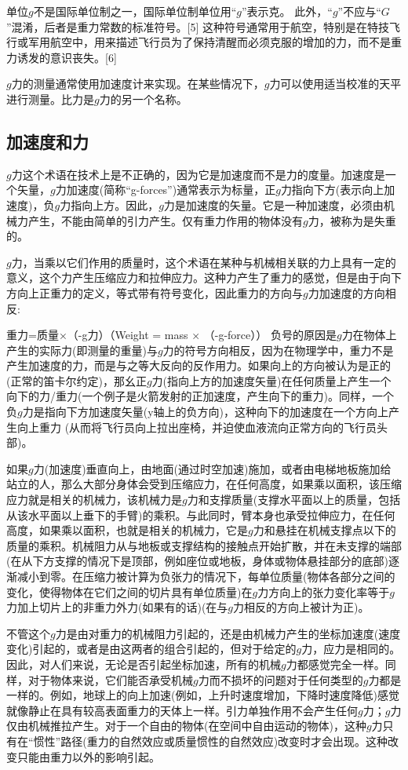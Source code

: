 单位$g$不是国际单位制之一，国际单位制单位用“$g$”表示克。 此外，“$g$”不应与“$G$”混淆，后者是重力常数的标准符号。[5] 这种符号通常用于航空，特别是在特技飞行或军用航空中，用来描述飞行员为了保持清醒而必须克服的增加的力，而不是重力诱发的意识丧失。[6]

$g$力的测量通常使用加速度计来实现。在某些情况下，$g$力可以使用适当校准的天平进行测量。比力是$g$力的另一个名称。

\subsection{加速度和力}
$g$力这个术语在技术上是不正确的，因为它是加速度而不是力的度量。加速度是一个矢量，$g$力加速度(简称“g-forces”)通常表示为标量，正$g$力指向下方(表示向上加速度)，负$g$力指向上方。因此，$g$力是加速度的矢量。它是一种加速度，必须由机械力产生，不能由简单的引力产生。仅有重力作用的物体没有$g$力，被称为是失重的。

$g$力，当乘以它们作用的质量时，这个术语在某种与机械相关联的力上具有一定的意义，这个力产生压缩应力和拉伸应力。这种力产生了重力的感觉，但是由于向下方向上正重力的定义，等式带有符号变化，因此重力的方向与$g$力加速度的方向相反:

重力=质量×（-g力）（Weight = mass × （-g-force））
负号的原因是$g$力在物体上产生的实际力(即测量的重量)与$g$力的符号方向相反，因为在物理学中，重力不是产生加速度的力，而是与之等大反向的反作用力。如果向上的方向被认为是正的(正常的笛卡尔约定)，那幺正$g$力(指向上方的加速度矢量)在任何质量上产生一个向下的力/重力(一个例子是火箭发射的正加速度，产生向下的重力)。同样，一个负$g$力是指向下方加速度矢量(y轴上的负方向)，这种向下的加速度在一个方向上产生向上重力 (从而将飞行员向上拉出座椅，并迫使血液流向正常方向的飞行员头部)。

如果$g$力(加速度)垂直向上，由地面(通过时空加速)施加，或者由电梯地板施加给站立的人，那么大部分身体会受到压缩应力，在任何高度，如果乘以面积，该压缩应力就是相关的机械力，该机械力是$g$力和支撑质量(支撑水平面以上的质量，包括从该水平面以上垂下的手臂)的乘积。与此同时，臂本身也承受拉伸应力，在任何高度，如果乘以面积，也就是相关的机械力，它是$g$力和悬挂在机械支撑点以下的质量的乘积。机械阻力从与地板或支撑结构的接触点开始扩散，并在未支撑的端部(在从下方支撑的情况下是顶部，例如座位或地板，身体或物体悬挂部分的底部)逐渐减小到零。在压缩力被计算为负张力的情况下，每单位质量(物体各部分之间的变化，使得物体在它们之间的切片具有单位质量)在$g$力方向上的张力变化率等于$g$力加上切片上的非重力外力(如果有的话)(在与$g$力相反的方向上被计为正)。

不管这个$g$力是由对重力的机械阻力引起的，还是由机械力产生的坐标加速度(速度变化)引起的，或者是由这两者的组合引起的，但对于给定的$g$力，应力是相同的。因此，对人们来说，无论是否引起坐标加速，所有的机械$g$力都感觉完全一样。同样，对于物体来说，它们能否承受机械$g$力而不损坏的问题对于任何类型的$g$力都是一样的。例如，地球上的向上加速(例如，上升时速度增加，下降时速度降低)感觉就像静止在具有较高表面重力的天体上一样。引力单独作用不会产生任何$g$力；$g$力仅由机械推拉产生。对于一个自由的物体(在空间中自由运动的物体)，这种$g$力只有在“惯性”路径(重力的自然效应或质量惯性的自然效应)改变时才会出现。这种改变只能由重力以外的影响引起。

